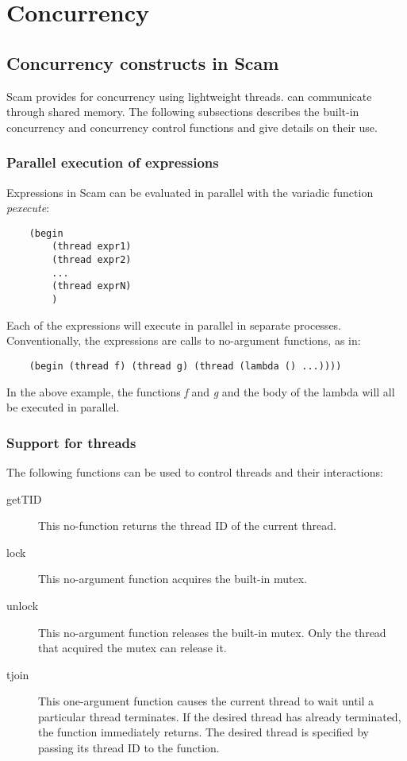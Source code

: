 \chapter{Concurrency}
\label{Concurrency}

\section{Concurrency constructs in Scam}

Scam provides for concurrency using lightweight threads.
can communicate through shared memory. The following subsections
describes the built-in concurrency and concurrency control
functions and give details on
their use.

\subsection{Parallel execution of expressions}

Expressions in Scam can be evaluated in parallel with the variadic function
{\it pexecute}:

\begin{verbatim}
    (begin
        (thread expr1)
        (thread expr2)
        ...
        (thread exprN)
        )
\end{verbatim}

Each of the expressions will execute in parallel in separate processes.
Conventionally, the expressions are calls to no-argument functions, as in:

\begin{verbatim}
    (begin (thread f) (thread g) (thread (lambda () ...))))
\end{verbatim}

In the above example, the functions {\it f} and {\it g}
and the body of the lambda
will all be executed in parallel.

\subsection{Support for threads}

The following functions can be used to control threads and their
interactions:

\begin{description}
\item[getTID] This no-function returns the thread ID of the current thread.
\item[lock] This no-argument function acquires the built-in mutex.
\item[unlock] This no-argument function releases the built-in mutex.
Only the thread that acquired the mutex can release it.
\item[tjoin] This one-argument function causes the current thread to wait until
a particular thread terminates. If the desired thread has already terminated,
the function immediately returns. The desired thread is specified by passing
its thread ID to the function.
\end{description}


